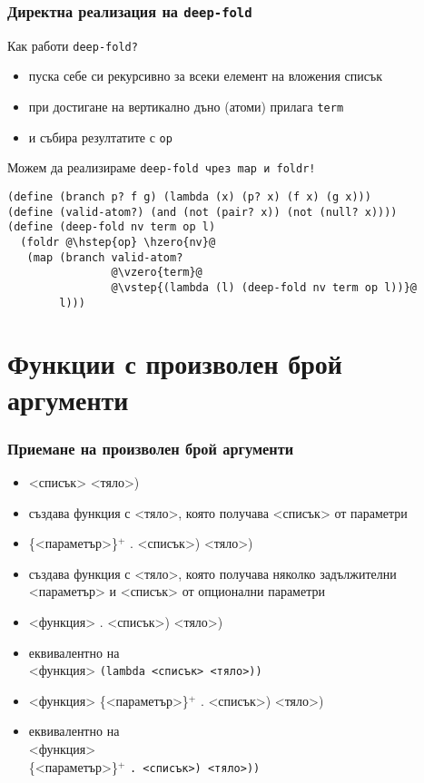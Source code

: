 \documentclass{beamer}
\begin{document}
\begin{frame}[fragile]
  \frametitle{Директна реализация на \tt{deep-fold}}

  Как работи \tt{deep-fold}?
  \pause
  \begin{itemize}[<+->]
  \item пуска себе си рекурсивно за всеки елемент на вложения списък
  \item при достигане на вертикално дъно (атоми) прилага \tt{term}
  \item и събира резултатите с \tt{op}
  \end{itemize}
  \onslide<+->
  Можем да реализираме \tt{deep-fold} чрез \tt{map} и \tt{foldr}!
  \onslide<+->
\begin{lstlisting}
(define (branch p? f g) (lambda (x) (p? x) (f x) (g x)))
(define (valid-atom?) (and (not (pair? x)) (not (null? x))))
(define (deep-fold nv term op l)
  (foldr @\hstep{op} \hzero{nv}@
   (map (branch valid-atom?
                @\vzero{term}@
                @\vstep{(lambda (l) (deep-fold nv term op l))}@
        l)))
\end{lstlisting}
\end{frame}

\section{Функции с произволен брой аргументи}

\begin{frame}
  \frametitle{Приемане на произволен брой аргументи}

  \begin{itemize}[<+->]
  \item {}<списък> <тяло>\tta)
  \item създава функция с <тяло>, която получава <списък> от параметри
  \item {}\{<параметър>\}$^+$ \tta. <списък>\tta) <тяло>\tta)
  \item създава функция с <тяло>, която получава няколко задължителни <параметър> и <списък> от опционални параметри
  \item {}<функция> \tta. <списък>\tta) <тяло>\tta)
  \item еквивалентно на \\
     <функция> \tt{(lambda }<списък> <тяло>\tt{))}
  \item {}<функция> \{<параметър>\}$^+$ \tta. <списък>\tta) <тяло>\tta)
  \item еквивалентно на \\
     <функция>\\
    \hspace{10ex}\{<параметър>\}$^+$ \tt. <списък>\tt) <тяло>\tt{))}
  \end{itemize}
\end{frame}
\end{document}
